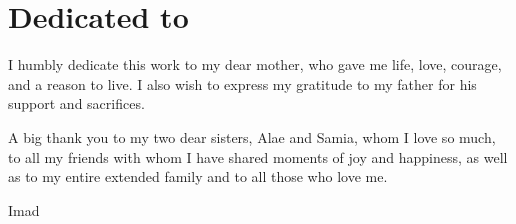 \chapter*{Dedicated to}

\begin{dedication}
  
  \hspace{1em} I humbly dedicate this work to my dear mother, who gave me life, love, courage, and a reason to live.
  I also wish to express my gratitude to my father for his support and sacrifices.
  \vspace{\baselineskip}
  \par   %
  
  A big thank you to my two dear sisters, Alae and Samia, whom I love so much,
  to all my friends with whom I have shared moments of joy and happiness, as well as to my entire extended family and to all those who love me.

  \vspace{\baselineskip}
  \hspace*{\fill}  Imad
  
\end{dedication}